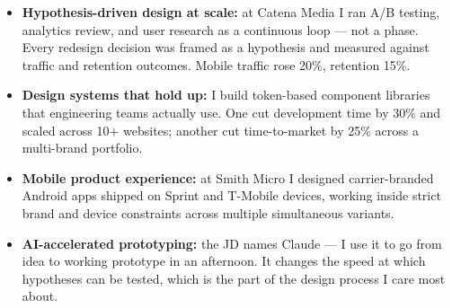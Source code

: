 \documentclass[]{cover-fira}
\begin{document}


\currentdate{\today}



{\raggedright{}\fontsize{11pt}{13pt}\selectfont
\begin{itemize}
    \item \textbf{Hypothesis-driven design at scale:} at Catena Media I ran A/B testing, analytics review, and user research as a continuous loop — not a phase. Every redesign decision was framed as a hypothesis and measured against traffic and retention outcomes. Mobile traffic rose 20\%, retention 15\%.
    \item \textbf{Design systems that hold up:} I build token-based component libraries that engineering teams actually use. One cut development time by 30\% and scaled across 10+ websites; another cut time-to-market by 25\% across a multi-brand portfolio.
    \item \textbf{Mobile product experience:} at Smith Micro I designed carrier-branded Android apps shipped on Sprint and T-Mobile devices, working inside strict brand and device constraints across multiple simultaneous variants.
    \item \textbf{AI-accelerated prototyping:} the JD names Claude — I use it to go from idea to working prototype in an afternoon. It changes the speed at which hypotheses can be tested, which is the part of the design process I care most about.
\end{itemize}\par}
\vspace{6pt}
\end{document}
